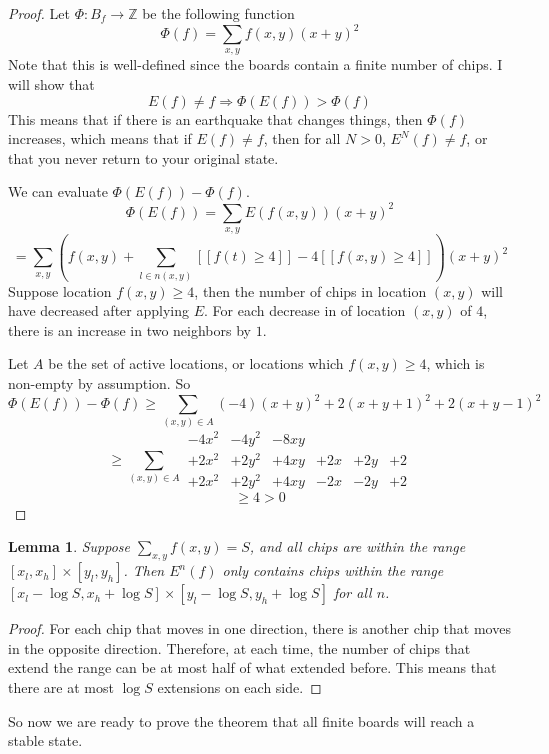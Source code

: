 \documentclass[11pt]{article}
\newtheorem{lemma}{Lemma}
\begin{document}
\begin{proof}
Let $\Phi: B_f \rightarrow \mathbb{Z}$ be the following function
\[ \Phi(f) = \sum_{x,y} f(x,y)(x+y)^2 \]
Note that this is well-defined since the boards contain a finite number of chips. I will show that 
\[ E(f) \neq f \Rightarrow \Phi(E(f)) > \Phi(f) \]
This means that if there is an earthquake that changes things, then $\Phi(f)$ increases, which means that if $E(f) \neq f$, then for all $N > 0$, $E^N(f) \neq f$, or that you never return to your original state.

We can evaluate $\Phi(E(f)) - \Phi(f)$.
\[ \Phi(E(f)) = \sum_{x,y} E(f(x,y)) (x+y)^2 \]
\[ = \sum_{x,y} \left(f(x,y) + \sum_{l \in n(x,y)} [[f(t) \geq 4]] - 4[[f(x,y) \geq 4]]\right) (x+y)^2 \]
Suppose location $f(x,y) \geq 4$, then the number of chips in location $(x,y)$ will have decreased after applying $E$. For each decrease in of location $(x,y)$ of $4$, there is an increase in two neighbors by $1$. 

Let $A$ be the set of active locations, or locations which $f(x,y) \geq 4$, which is non-empty by assumption. 
So
\[ \Phi(E(f)) - \Phi(f) \geq \sum_{(x,y) \in A} (-4)(x+y)^2 + 2(x+y+1)^2 + 2(x+y-1)^2 \]
\[ \geq \sum_{(x,y) \in A} \begin{array}{cccccc} -4x^2 & -4y^2 & -8xy & & &\\
									   +2x^2 & +2y^2 & +4xy & +2x& +2y &+ 2\\
									   +2x^2 & +2y^2 & +4xy & -2x& -2y  & +2 \end{array} \]
\[ \geq 4 > 0 \] 
\end{proof}

\begin{lemma}
\label{finiteextension}
Suppose $\sum_{x,y} f(x,y) = S$, and all chips are within the range $[x_l, x_h] \times [y_l, y_h]$. Then $E^n(f)$ only contains chips within the range $[x_l - \log S, x_h + \log S] \times [y_l-\log S, y_h+\log S]$ for all $n$.
\end{lemma}

\begin{proof}
For each chip that moves in one direction, there is another chip that moves in the opposite direction. Therefore, at each time, the number of chips that extend the range can be at most half of what extended before. This means that there are at most $\log S$ extensions on each side. 
\end{proof}

So now we are ready to prove the theorem that all finite boards will reach a stable state. 
\end{document}
